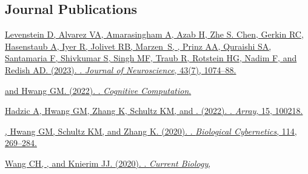 

\subsection*{Journal Publications}
\label{sec:journalpubs}

\begin{description}
  \item \href{https://doi.org/10.1523/JNEUROSCI.1179-22.2022}
    {Levenstein D, Alvarez VA, Amarasingham A, Azab H, Zhe S. Chen, Gerkin
      RC, Hasenstaub A, Iyer R, Jolivet RB, Marzen~S, , Prinz
      AA, Quraishi SA, Santamaria F, Shivkumar S, Singh MF, Traub R, Rotstein
      HG, Nadim F, and Redish AD. (2023). . \emph{Journal of Neuroscience}, 43(7), 1074--88.
    }
  \item \href{https://dx.doi.org/10.1007/s12559-022-10081-9}
    { and Hwang GM. (2022). . \emph{Cognitive
    Computation}. }
  \item \href{https://doi.org/10.1016/j.array.2022.100218} {Hadzic
      A, Hwang GM, Zhang K, Schultz KM, and . (2022).
      . \emph{Array}, 15, 100218.
    }\label{sec:hadzicpub}
  \item \href{https://dx.doi.org/10.1007/s00422-020-00823-z}
    {, Hwang GM, Schultz KM, and Zhang K. (2020).
      . \emph{Biological Cybernetics}, 114,
    269--284. }
  \item \href{https://dx.doi.org/10.1016/j.cub.2020.01.083} 
    {Wang CH, , and Knierim JJ. (2020). . \emph{Current Biology},
}
\end{description}
